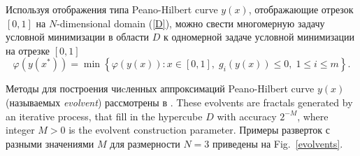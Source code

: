 \documentclass[
11pt,%
tightenlines,%
twoside,%
onecolumn,%
nofloats,%
nobibnotes,%
nofootinbib,%
superscriptaddress,%
noshowpacs,%
centertags]%
{revtex4}
\begin{document}

Используя отображения типа Peano-Hilbert curve $y(x)$, отображающие отрезок $[0,1]$ на $N$-dimensional domain (\ref{D}),
можно свести многомерную задачу условной минимизации в области $D$ к одномерной задаче условной минимизации на отрезке $[0,1]$
\begin{equation}\label{problem1}
\varphi(y(x^\ast))=\min \left\{\varphi(y(x)): x \in [0,1], \; g_i(y(x))\leq 0, \; 1 \leq i \leq m\right\}.
\end{equation}

Методы для построения чиcленных аппроксимаций Peano-Hilbert curve $y(x)$ (называемых \textit{evolvent}) рассмотрены в \cite{Strongin2013}. These evolvents are fractals generated by an iterative process, that fill in the hypercube $D$ with accuracy $2^{-M}$, where integer $M>0$ is the evolvent construction parameter. 
Примеры разверток с разными значениями $M$  для размерности $N=3$ приведены на Fig.~\ref{evolvents}.
\end{document}
